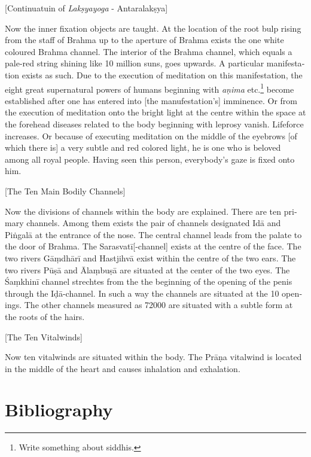 \begin{otherlanguage}{english}
\begin{tlate}
     \bigskip
        \centerline{\textrm{\small{[Continuatuin of \textit{Lakṣyayoga} - Antaralakṣya]}}}
          \bigskip
Now the inner fixation objects are taught. At the location of the root bulp rising from the staff of Brahma up to the aperture of Brahma exists the one white coloured Brahma channel. The interior of the Brahma channel, which equals a pale-red string shining like 10 million suns, goes upwards. A particular manifestation exists as such. Due to the execution of meditation on this manifestation, the eight great supernatural powers of humans beginning with \textit{aṇima} etc.\footnote{Write something about siddhis.} become established after one has entered into [the manufestation's] imminence. Or from the execution of meditation onto the bright light at the centre within the space at the forehead diseases related to the body beginning with leprosy vanish. Lifeforce increases. Or because of executing meditation on the middle of the eyebrows [of which there is] a very subtle and red colored light, he is one who is beloved among all royal people. Having seen this person, everybody's gaze is fixed onto him.
\end{tlate}
\begin{tlate}
 \bigskip
 \centerline{\textrm{\small{[The Ten Main Bodily Channels]}}}
 \bigskip
 Now the divisions of channels within the body are explained. There are ten primary channels. Among them exists the pair of channels designated Idā and Piṅgalā at the entrance of the nose. The central channel leads from the palate to the door of Brahma. The Sarasvatī[-channel] exists at the centre of the face. The two rivers Gāṃdhārī and Hastjihvā exist within the centre of the two ears. The two rivers Pūṣā and Ālaṃbuṣā are situated at the center of the two eyes. The Śaṃkhinī channel strechtes from the the beginning of the opening of the penis through the Iḍā-channel. In such a way the channels are situated at the 10 openings. The other channels measured as 72000 are situated with a subtle form at the roots of the hairs.
\end{tlate}
 \begin{tlate}
\bigskip
 \centerline{\textrm{\small{[The Ten Vitalwinds]}}}
 \bigskip
 Now ten vitalwinds are situated within the body. The Prāṇa vitalwind is located in the middle of the heart and causes inhalation and exhalation. 
\end{tlate}
\end{otherlanguage}
\section{Bibliography}
 \label{sec:bibli}
 

\printshorthands[keyword=critEd]

\printbibliography[title=Consulted Manuskcipts, keyword=codex]

\printbibliography[title=Printed Editions, keyword=printsource]

\printbibliography[title=Secondary Literature, keyword=seclit]



